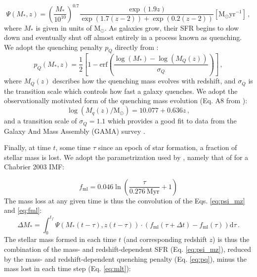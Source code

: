 \documentclass[fleqn,usenatbib]{mnras}
\begin{document}
\begin{equation}
    \Psi(M_*,z) = \left(\frac{M_*}{10^{10}}\right)^{0.7}\frac{\exp{\left(1.9z\right)}}{\exp{\left(1.7\left(z-2\right)\right)} + \exp{\left(0.2\left(z-2\right)\right)} } [\mathrm{M}_{\odot} \mathrm{yr}^{-1}]\,,
    \label{eq:psi_mz}
\end{equation}
where $M_*$ is given in units of $\mathrm{M}_{\odot}$.
As galaxies grow, their SFR begins to slow down and eventually shut off almost entirely in a process known as quenching. We adopt the quenching penalty $p_Q$ directly from :
\begin{equation}
    p_Q(M_*,z) = \frac{1}{2}\left[1 - \mathrm{erf}\left(\frac{\log(M_*) - \log(M_Q(z))}{\sigma_Q}\right)\right]\,,
    \label{eq:pq}
\end{equation}
where $M_Q(z)$ describes how the quenching mass evolves with redshift, and $\sigma_Q$ is the transition scale which controls how fast a galaxy quenches. We adopt the observationally motivated form of the quenching mass evolution (Eq. A8 from ):
\begin{equation}
    \log(M_q(z)/\mathrm{M}_{\odot}) = 10.077 + 0.636z \,, 
    \label{eq:mq}
\end{equation}
and a transition scale of $\sigma_Q = 1.1$ which provides a good fit to data from the Galaxy And Mass Assembly (GAMA) survey \citep{Baldry2012}.

Finally, at time $t$, some time $\tau$ since an epoch of star formation, a fraction of stellar mass is lost. We adopt the parametrization used by , namely that of \citet{Leitner2011} for a Chabrier 2003 IMF:

\begin{equation}
    f_{\mathrm{ml}} = 0.046\ln \left(\frac{\tau}{0.276~\mathrm{Myr}}+1 \right)
    \label{eq:fml}
\end{equation}
The mass loss at any given time is thus the convolution of the Eqs. \ref{eq:psi_mz} and \ref{eq:fml}:
\begin{equation}
    \Delta M_* = \int_0^{t_f} \Psi(M_*(t-\tau),z(t-\tau))\cdot\left(f_{\mathrm{ml}}(\tau + \Delta t) - f_{\mathrm{ml}}(\tau)\right)\mathrm{d}\tau\,.
    \label{eq:mlt}
\end{equation}
The stellar mass formed in each time $t$ (and corresponding redshift $z$) is thus the combination of the mass- and redshift-dependent SFR (Eq. \ref{eq:psi_mz}), reduced by the mass- and redshift-dependent quenching penalty (Eq. \ref{eq:pq}), minus the mass lost in each time step (Eq. \ref{eq:mlt}):
\end{document}
